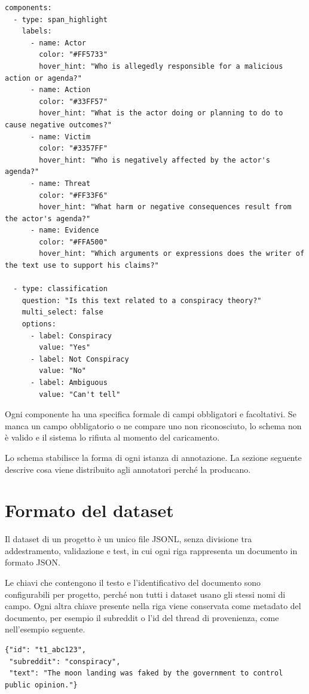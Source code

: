 \documentclass[]{sapthesis}
\begin{document}
\begin{lstlisting}
components:
  - type: span_highlight
    labels:
      - name: Actor
        color: "#FF5733"
        hover_hint: "Who is allegedly responsible for a malicious action or agenda?"
      - name: Action
        color: "#33FF57"
        hover_hint: "What is the actor doing or planning to do to cause negative outcomes?"
      - name: Victim
        color: "#3357FF"
        hover_hint: "Who is negatively affected by the actor's agenda?"
      - name: Threat
        color: "#FF33F6"
        hover_hint: "What harm or negative consequences result from the actor's agenda?"
      - name: Evidence
        color: "#FFA500"
        hover_hint: "Which arguments or expressions does the writer of the text use to support his claims?"

  - type: classification
    question: "Is this text related to a conspiracy theory?"
    multi_select: false
    options:
      - label: Conspiracy
        value: "Yes"
      - label: Not Conspiracy
        value: "No"
      - label: Ambiguous
        value: "Can't tell"
\end{lstlisting}

Ogni componente ha una specifica formale di campi obbligatori e facoltativi. Se manca un campo obbligatorio o ne compare uno non riconosciuto, lo schema non è valido e il sistema lo rifiuta al momento del caricamento.

Lo schema stabilisce la forma di ogni istanza di annotazione. La sezione seguente descrive cosa viene distribuito agli annotatori perché la producano.

\section{Formato del dataset}
\label{sec:dataset}

Il dataset di un progetto è un unico file JSONL, senza divisione tra addestramento, validazione e test, in cui ogni riga rappresenta un documento in formato JSON.

Le chiavi che contengono il testo e l'identificativo del documento sono configurabili per progetto, perché non tutti i dataset usano gli stessi nomi di campo. Ogni altra chiave presente nella riga viene conservata come metadato del documento, per esempio il subreddit o l'id del thread di provenienza, come nell'esempio seguente.

\begin{lstlisting}
{"id": "t1_abc123",
 "subreddit": "conspiracy",
 "text": "The moon landing was faked by the government to control public opinion."}
\end{lstlisting}
\end{document}
